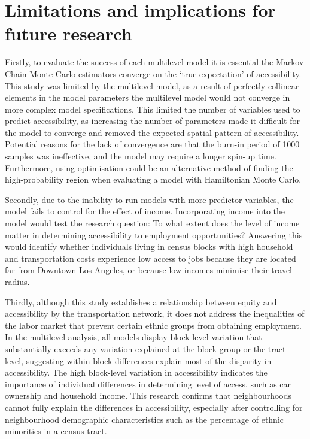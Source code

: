 \documentclass[a4paper,UKenglish]{lipics-v2018}
\begin{document}
\pagebreak
\section{Limitations and implications for future research}
Firstly, to evaluate the success of each multilevel model it is essential the Markov Chain Monte Carlo estimators converge on the ‘true expectation’ of accessibility. This study was limited by the multilevel model, as a result of perfectly collinear elements in the model parameters the multilevel model would not converge in more complex model specifications. This limited the number of variables used to predict accessibility, as increasing the number of parameters made it difficult for the model to converge and removed the expected spatial pattern of accessibility. Potential reasons for the lack of convergence are that the burn-in period of 1000 samples was ineffective, and the model may require a longer spin-up time. Furthermore, using optimisation could be an alternative method of finding the high-probability region when evaluating a model with Hamiltonian Monte Carlo. 

Secondly, due to the inability to run models with more predictor variables, the model fails to control for the effect of income. Incorporating income into the model would test the research question: To what extent does the level of income matter in determining accessibility to employment opportunities? Answering this would identify whether individuals living in census blocks with high household and transportation costs experience low access to jobs because they are located far from Downtown Los Angeles, or because low incomes minimise their travel radius. 

Thirdly, although this study establishes a relationship between equity and accessibility by the transportation network, it does not address the inequalities of the labor market that prevent certain ethnic groups from obtaining employment. In the multilevel analysis, all models display block level variation that substantially exceeds any variation explained at the block group or the tract level, suggesting within-block differences explain most of the disparity in accessibility. The high block-level variation in accessibility indicates the importance of individual differences in determining level of access, such as car ownership and household income. This research confirms that neighbourhoods cannot fully explain the differences in accessibility, especially after controlling for neighbourhood demographic characteristics such as the percentage of ethnic minorities in a census tract. 
\end{document}
